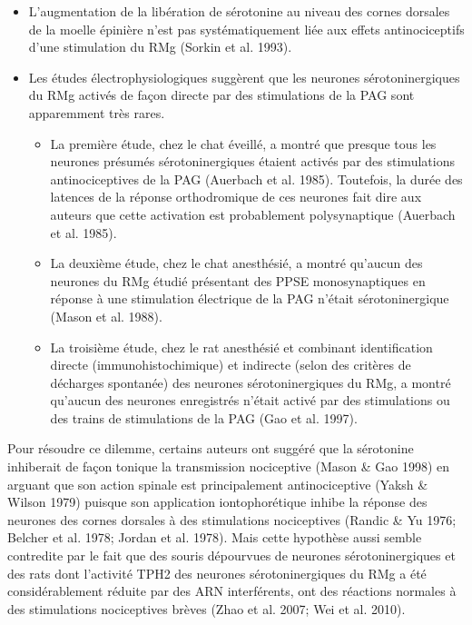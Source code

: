 \documentclass[a4paper,12pt,twoside]{report}
\begin{document}
\begin{itemize}
\item L’augmentation de la libération de sérotonine au niveau des cornes dorsales de la moelle épinière n’est pas systématiquement liée aux effets antinociceptifs d’une stimulation du RMg (Sorkin et al. 1993). 
\item Les études électrophysiologiques suggèrent que les neurones sérotoninergiques du RMg activés de façon directe par des stimulations de la PAG sont apparemment très rares.
\begin{itemize}
\item La première étude, chez le chat éveillé, a montré que presque tous les neurones présumés sérotoninergiques étaient activés par des stimulations antinociceptives de la PAG (Auerbach et al. 1985). Toutefois, la durée des latences de la réponse orthodromique de ces neurones fait dire aux auteurs que cette activation est probablement polysynaptique (Auerbach et al. 1985). 
\item La deuxième étude, chez le chat anesthésié, a montré qu’aucun des neurones du RMg étudié présentant des PPSE monosynaptiques en réponse à une stimulation électrique de la PAG n’était sérotoninergique (Mason et al. 1988). 
\item La troisième étude, chez le rat anesthésié et combinant identification directe (immunohistochimique) et indirecte (selon des critères de décharges spontanée) des neurones sérotoninergiques du RMg, a montré qu’aucun des neurones enregistrés n’était activé par des stimulations ou des trains de stimulations de la PAG (Gao et al. 1997).
\end{itemize}
\end{itemize}

\bigskip 

Pour résoudre ce dilemme, certains auteurs ont suggéré que la sérotonine inhiberait de façon tonique la transmission nociceptive (Mason \& Gao 1998) en arguant que son action spinale est principalement antinociceptive (Yaksh \& Wilson 1979) puisque son application iontophorétique inhibe la réponse des neurones des cornes dorsales à des stimulations nociceptives (Randic \& Yu 1976; Belcher et al. 1978; Jordan et al. 1978). Mais cette hypothèse aussi semble contredite par le fait que des souris dépourvues de neurones sérotoninergiques et des rats dont l’activité TPH2 des neurones sérotoninergiques du RMg a été considérablement réduite par des ARN interférents, ont des réactions normales à des stimulations nociceptives brèves (Zhao et al. 2007; Wei et al. 2010). 
\end{document}
